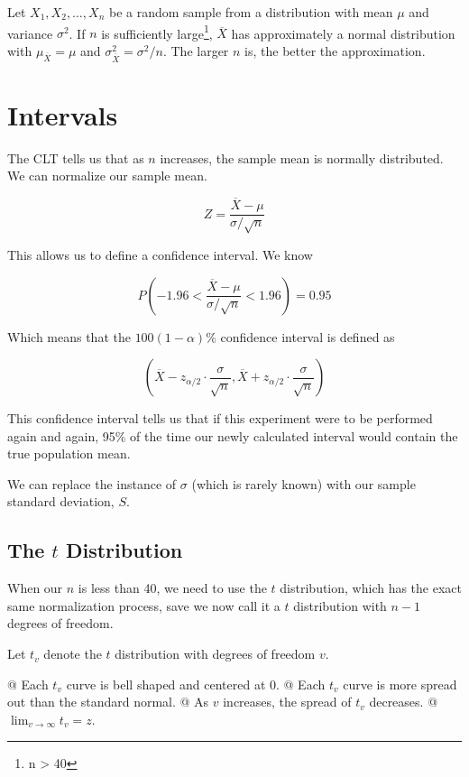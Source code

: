 Let $X_1, X_2, \ldots, X_n$ be a random sample from a distribution with mean $\mu$ and variance $\sigma^2$. If $n$ is
sufficiently large\footnote{n > 40}, $\overline{X}$ has approximately a normal distribution with $\mu_{\overline{X}} = \mu$ and
$\sigma^2_{\overline{X}} = \sigma^2 / n$. The larger $n$ is, the better the approximation.

\section{Intervals}
The CLT tells us that as $n$ increases, the sample mean is normally distributed. We can normalize our sample mean.

\[
    Z = \frac{\overline{X} - \mu}{\sigma / \sqrt{n}}
\]

This allows us to define a confidence interval. We know 

\[
    P \left( -1.96 < \frac{\overline{X} - \mu}{\sigma / \sqrt{n}} < 1.96 \right) = 0.95
\]

Which means that the $100 ( 1 - \alpha)\%$ confidence interval is defined as

\[
    \left(
    \overline{X} - z_{\alpha/2} \cdot \frac{\sigma}{\sqrt{n}},
    \overline{X} + z_{\alpha/2} \cdot \frac{\sigma}{\sqrt{n}}
    \right)
\]

This confidence interval tells us that if this experiment were to be performed again and again, 95\% of the time our
newly calculated interval would contain the true population mean.

We can replace the instance of $\sigma$ (which is rarely known) with our sample standard deviation, $S$.

    \subsection{The $t$ Distribution}
    When our $n$ is less than 40, we need to use the $t$ distribution, which has the exact same normalization process,
    save we now call it a $t$ distribution with $n - 1$ degrees of freedom.

    Let $t_v$ denote the $t$ distribution with degrees of freedom $v$.

    \NewList
    \begin{easylist}
        @ Each $t_v$ curve is bell shaped and centered at 0.
        @ Each $t_v$ curve is more spread out than the standard normal.
        @ As $v$ increases, the spread of $t_v$ decreases.
        @ $ \lim_{v \to \infty} t_v = z$.
    \end{easylist}

